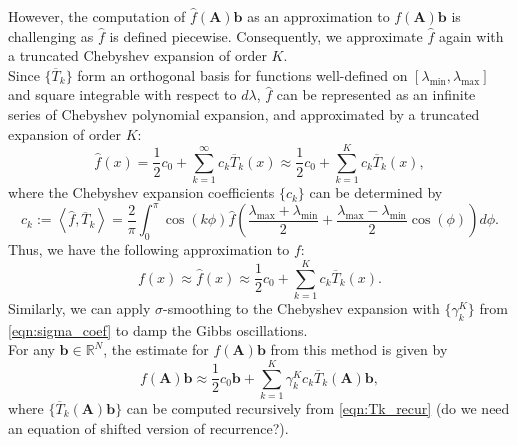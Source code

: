 \documentclass[11pt,letter]{article}
\begin{document}
However, the computation of $\hat{f}(\mathbf{A})\mathbf{b}$ as an approximation to $f(\mathbf{A})\mathbf{b}$ is challenging as $\hat{f}$ is defined piecewise. Consequently, we approximate $\hat{f}$ again with a truncated Chebyshev expansion of order $K$.  \\

Since $\{\overline{T}_k\}$ form an orthogonal basis for functions well-defined on $[\lambda_{\min}, \lambda_{\max}]$ and square integrable with respect to $d\lambda$, $\hat{f}$ can be represented as an infinite series of Chebyshev polynomial expansion, and approximated by a truncated expansion of order $K$:
\begin{equation}
\label{eqn:cheb_expand_fhat}
\hat{f}(x)=\frac{1}{2}c_0 +\sum_{k=1}^\infty c_k \overline{T}_k(x)\approx \frac{1}{2}c_0 +\sum_{k=1}^K c_k \overline{T}_k(x),
\end{equation} where the Chebyshev expansion coefficients $\{c_k\}$ can be determined by
\begin{equation}
c_k:=\left<\hat{f},\overline{T}_k\right>=\frac{2}{\pi}\int_0^{\pi}\cos(k\phi)\hat{f}\left(\frac{\lambda_{\max}+\lambda_{\min}}{2}+\frac{\lambda_{\max}-\lambda_{\min}}{2}\cos(\phi)\right)d\phi.
\end{equation}
Thus, we have the following approximation to $f$:
\begin{equation}
f(x)\approx \hat{f}(x)\approx \frac{1}{2}c_0 +\sum_{k=1}^K c_k \overline{T}_k(x).
\end{equation}
Similarly, we can apply $\sigma$-smoothing to the Chebyshev expansion with $\{\gamma_k^K\}$ from \eqref{eqn:sigma_coef} to damp the Gibbs oscillations.\\

For any $\mathbf{b}\in\mathbb{R}^N$, the estimate for $f(\mathbf{A})\mathbf{b}$ from this method is given by
\begin{equation}
\label{eqn:pchip_cheb_fab}
f(\mathbf{A})\mathbf{b}\approx\frac{1}{2}c_0 \mathbf{b}+\sum_{k=1}^K \gamma_{k}^Kc_k\overline{T}_k(\mathbf{A})\mathbf{b},
\end{equation}
where $\{\overline{T}_k(\mathbf{A})\mathbf{b}\}$ can be computed recursively from \eqref{eqn:Tk_recur} (do we need an equation of shifted version of recurrence?).\\
\end{document}
